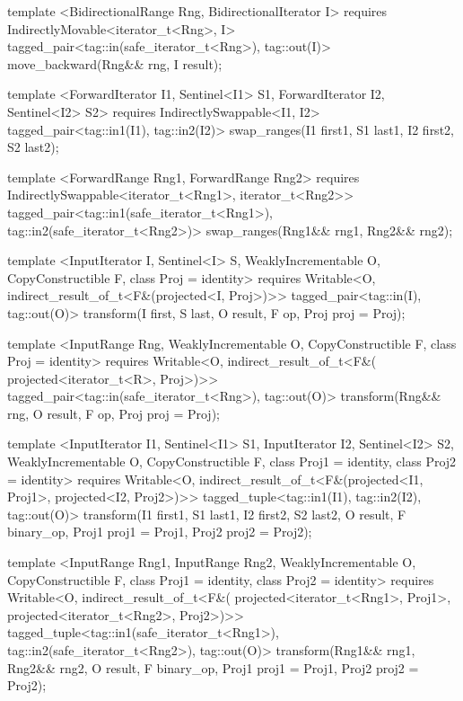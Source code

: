 \begin{codeblock}
{{{{  template <BidirectionalRange Rng, BidirectionalIterator I>
    requires IndirectlyMovable<iterator_t<Rng>, I>
    tagged_pair<tag::in(safe_iterator_t<Rng>), tag::out(I)>
      move_backward(Rng&& rng, I result);

  template <ForwardIterator I1, Sentinel<I1> S1, ForwardIterator I2, Sentinel<I2> S2>
    requires IndirectlySwappable<I1, I2>
    tagged_pair<tag::in1(I1), tag::in2(I2)>
      swap_ranges(I1 first1, S1 last1, I2 first2, S2 last2);

  template <ForwardRange Rng1, ForwardRange Rng2>
    requires IndirectlySwappable<iterator_t<Rng1>, iterator_t<Rng2>>
    tagged_pair<tag::in1(safe_iterator_t<Rng1>), tag::in2(safe_iterator_t<Rng2>)>
      swap_ranges(Rng1&& rng1, Rng2&& rng2);

  template <InputIterator I, Sentinel<I> S, WeaklyIncrementable O,
      CopyConstructible F, class Proj = identity>
    requires Writable<O, indirect_result_of_t<F&(projected<I, Proj>)>>
    tagged_pair<tag::in(I), tag::out(O)>
      transform(I first, S last, O result, F op, Proj proj = Proj{});

  template <InputRange Rng, WeaklyIncrementable O, CopyConstructible F,
      class Proj = identity>
    requires Writable<O, indirect_result_of_t<F&(
      projected<iterator_t<R>, Proj>)>>
    tagged_pair<tag::in(safe_iterator_t<Rng>), tag::out(O)>
      transform(Rng&& rng, O result, F op, Proj proj = Proj{});

  template <InputIterator I1, Sentinel<I1> S1, InputIterator I2, Sentinel<I2> S2,
      WeaklyIncrementable O, CopyConstructible F, class Proj1 = identity,
      class Proj2 = identity>
    requires Writable<O, indirect_result_of_t<F&(projected<I1, Proj1>,
      projected<I2, Proj2>)>>
    tagged_tuple<tag::in1(I1), tag::in2(I2), tag::out(O)>
      transform(I1 first1, S1 last1, I2 first2, S2 last2, O result,
              F binary_op, Proj1 proj1 = Proj1{}, Proj2 proj2 = Proj2{});

  template <InputRange Rng1, InputRange Rng2, WeaklyIncrementable O,
      CopyConstructible F, class Proj1 = identity, class Proj2 = identity>
    requires Writable<O, indirect_result_of_t<F&(
      projected<iterator_t<Rng1>, Proj1>, projected<iterator_t<Rng2>, Proj2>)>>
    tagged_tuple<tag::in1(safe_iterator_t<Rng1>),
                 tag::in2(safe_iterator_t<Rng2>),
                 tag::out(O)>
      transform(Rng1&& rng1, Rng2&& rng2, O result,
                F binary_op, Proj1 proj1 = Proj1{}, Proj2 proj2 = Proj2{});

}}}}
\end{codeblock}
